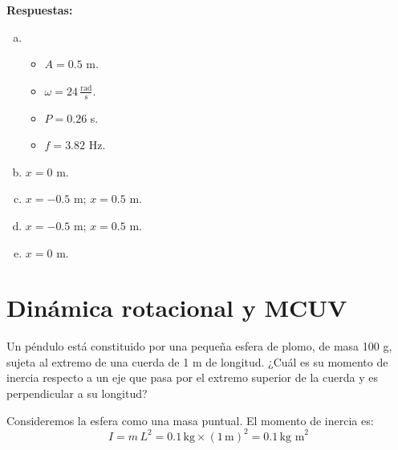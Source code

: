 \documentclass[addpoints]{exam}
\newcommand{\rtas}{\textbf{Respuestas: }}
\begin{document}
\begin{questions}

    \rtas
    \begin{enumerate}[a)]
        \item
        \begin{itemize}
            \item $A =0.5$ m.
            \item $\omega =24 \, \frac{\text{rad}}{\text{s}}$.
            \item $P = 0.26$ s.
            \item $f = 3.82$ Hz.
        \end{itemize}
        \item $ x = 0$ m.
        \item $ x = -0.5$ m; $x = 0.5$ m.
        \item $ x = -0.5$ m; $x = 0.5$ m.
        \item $ x = 0$ m.
    \end{enumerate}

    \section{Dinámica rotacional y MCUV}

    \question Un péndulo está constituido por una pequeña esfera de plomo, de masa 100 g, sujeta al extremo de una cuerda de 1 m de longitud. ¿Cuál es su momento de inercia respecto a un eje que pasa por el extremo superior de la cuerda y es perpendicular a su longitud?

    \begin{solution}
        Consideremos la esfera como una masa puntual. El momento de inercia es: $$I = m \, L^2 = 0.1 \, \text{kg} \times \left(1 \, \text{m}\right)^2 = 0.1 \, \text{kg m}^2$$
    \end{solution}


\end{questions}
\end{document}
